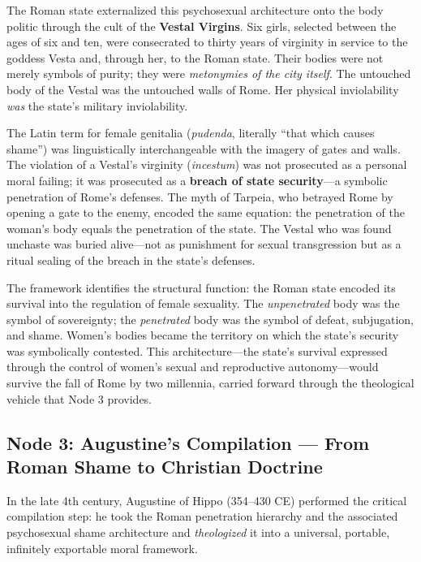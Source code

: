 \documentclass[12pt,openany]{book}
\begin{document}
The Roman state externalized this psychosexual architecture onto the body politic through the cult of the \textbf{Vestal Virgins}. Six girls, selected between the ages of six and ten, were consecrated to thirty years of virginity in service to the goddess Vesta and, through her, to the Roman state. Their bodies were not merely symbols of purity; they were \textit{metonymies of the city itself}. The untouched body of the Vestal was the untouched walls of Rome. Her physical inviolability \textit{was} the state's military inviolability.

The Latin term for female genitalia (\textit{pudenda}, literally ``that which causes shame'') was linguistically interchangeable with the imagery of gates and walls. The violation of a Vestal's virginity (\textit{incestum}) was not prosecuted as a personal moral failing; it was prosecuted as a \textbf{breach of state security}---a symbolic penetration of Rome's defenses. The myth of Tarpeia, who betrayed Rome by opening a gate to the enemy, encoded the same equation: the penetration of the woman's body equals the penetration of the state. The Vestal who was found unchaste was buried alive---not as punishment for sexual transgression but as a ritual sealing of the breach in the state's defenses.

The framework identifies the structural function: the Roman state encoded its survival into the regulation of female sexuality. The \textit{unpenetrated} body was the symbol of sovereignty; the \textit{penetrated} body was the symbol of defeat, subjugation, and shame. Women's bodies became the territory on which the state's security was symbolically contested. This architecture---the state's survival expressed through the control of women's sexual and reproductive autonomy---would survive the fall of Rome by two millennia, carried forward through the theological vehicle that Node 3 provides.

\subsection{Node 3: Augustine's Compilation --- From Roman Shame to Christian Doctrine}

In the late 4th century, Augustine of Hippo (354--430 CE) performed the critical compilation step: he took the Roman penetration hierarchy and the associated psychosexual shame architecture and \textit{theologized} it into a universal, portable, infinitely exportable moral framework.
\end{document}
